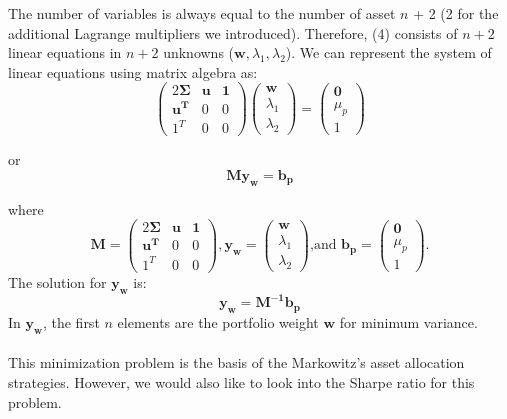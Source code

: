 \documentclass[12pt]{article}
\begin{document}
The number of variables is always equal to the number of asset $n$ + 2 (2 for the additional Lagrange multipliers we introduced). Therefore, (4) consists of $n+2$ linear equations in $n+2$ unknowns ($\mathbf{w}, \lambda_1, \lambda_2$). We can represent the system of linear equations using matrix algebra as: 
\begin{equation*}
\begin{pmatrix} 2\mathbf{\Sigma} & \mathbf{u} & \mathbf{1} \\ \mathbf{u^T} & 0 & 0 \\ 1^T & 0 & 0 \end{pmatrix} 
\begin{pmatrix}
\mathbf{w} \\ \lambda_1 \\ \lambda_2
\end{pmatrix}
 = 
\begin{pmatrix}
\mathbf{0} \\ \mu_p \\ 1
\end{pmatrix}
\end{equation*}

or 
$$
\mathbf{My_w} = \mathbf{b_p}
$$

where
\begin{equation*}
\mathbf{M} = \begin{pmatrix} 2\mathbf{\Sigma} & \mathbf{u} & \mathbf{1} \\ \mathbf{u^T} & 0 & 0 \\ 1^T & 0 & 0 \end{pmatrix}, 
\mathbf{y_w}=\begin{pmatrix}
\mathbf{w} \\ \lambda_1 \\ \lambda_2
\end{pmatrix} \text{,and }
\mathbf{b_p} = \begin{pmatrix}
\mathbf{0} \\ \mu_p \\ 1
\end{pmatrix}.
\end{equation*}
The solution for $\mathbf{y_w}$ is: 
\begin{equation}
\mathbf{y_w} = \mathbf{M^{-1}b_p}
\end{equation}
In $\mathbf{y_w}$, the first $n$ elements are the portfolio weight $\mathbf{w}$ for minimum variance. \\ \\
This minimization problem is the basis of the Markowitz's asset allocation strategies. However, we would also like to look into the Sharpe ratio for this problem. \\
\end{document}
